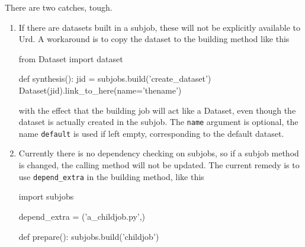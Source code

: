 There are two catches, tough.
\begin{enumerate}
  \item
If there are datasets built in a subjob,
these will not be explicitly available to Urd.  A workaround is to
copy the dataset to the building method like this
\begin{python}
from Dataset import dataset

def synthesis():
    jid = subjobs.build('create_dataset')
    Dataset(jid).link_to_here(name='thename')
\end{python}
with the effect that the building job will act like a Dataset, even
though the dataset is actually created in the subjob.  The
\texttt{name} argument is optional, the name \texttt{default} is used
if left empty, corresponding to the default dataset.

\item
Currently there is no dependency checking on subjobs, so if a subjob
method is changed, the calling method will not be updated.  The
current remedy is to use \texttt{depend\_extra} in the building
method, like this
\begin{python}
import subjobs

depend_extra = ('a_childjob.py',)

def prepare():
  subjobs.build('childjob')
\end{python}
\end{enumerate}
